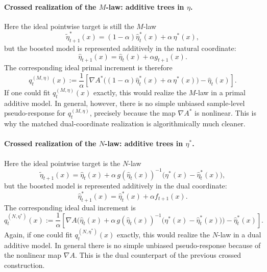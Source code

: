 \documentclass[11pt]{article}
\begin{document}
\paragraph{Crossed realization of the \(M\)-law: additive trees in \(\eta\).}
Here the ideal pointwise target is still the \(M\)-law
\[
\tilde\eta^\ast_{t+1}(x)
=
(1-\alpha)\hat\eta_t^\ast(x)+\alpha\,\eta^\ast(x),
\]
but the boosted model is represented additively in the natural coordinate:
\[
\hat\eta_{t+1}(x)=\hat\eta_t(x)+\alpha g_{t+1}(x).
\]
The corresponding ideal primal increment is therefore
\[
q_t^{(M,\eta)}(x)
:=
\frac{1}{\alpha}
\left[
\nabla A^\ast\!\Big((1-\alpha)\hat\eta_t^\ast(x)+\alpha\,\eta^\ast(x)\Big)
-
\hat\eta_t(x)
\right].
\]
If one could fit \(q_t^{(M,\eta)}(x)\) exactly, this would realize the \(M\)-law in a primal additive model. In general, however, there is no simple unbiased sample-level pseudo-response for \(q_t^{(M,\eta)}\), precisely because the map \(\nabla A^\ast\) is nonlinear. This is why the matched dual-coordinate realization is algorithmically much cleaner.

\paragraph{Crossed realization of the \(N\)-law: additive trees in \(\eta^\ast\).}
Here the ideal pointwise target is the \(N\)-law
\[
\tilde\eta_{t+1}(x)
=
\hat\eta_t(x)
+
\alpha\,g(\hat\eta_t(x))^{-1}\bigl(\eta^\ast(x)-\hat\eta_t^\ast(x)\bigr),
\]
but the boosted model is represented additively in the dual coordinate:
\[
\hat\eta^\ast_{t+1}(x)=\hat\eta_t^\ast(x)+\alpha f_{t+1}(x).
\]
The corresponding ideal dual increment is
\[
q_t^{(N,\eta^\ast)}(x)
:=
\frac{1}{\alpha}
\left[
\nabla A\!\Big(
\hat\eta_t(x)+\alpha\,g(\hat\eta_t(x))^{-1}\bigl(\eta^\ast(x)-\hat\eta_t^\ast(x)\bigr)
\Big)
-
\hat\eta_t^\ast(x)
\right].
\]
Again, if one could fit \(q_t^{(N,\eta^\ast)}(x)\) exactly, this would realize the \(N\)-law in a dual additive model. In general there is no simple unbiased pseudo-response because of the nonlinear map \(\nabla A\). This is the dual counterpart of the previous crossed construction.
\end{document}
